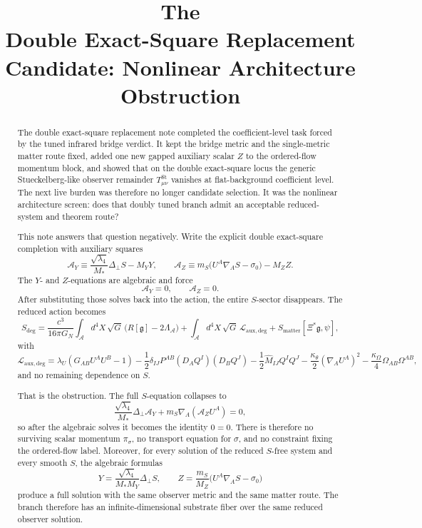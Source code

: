 \documentclass[11pt]{article}
\title{\textbf{The \TheoryName{}}\\[0.4em]
\large Double Exact-Square Replacement Candidate: Nonlinear Architecture Obstruction}
\author{}
\date{}
\newcommand{\Sub}{\mathcal{A}}
\newcommand{\BridgeMetric}{\mathfrak{g}}
\newcommand{\AY}{\mathcal A_Y}
\newcommand{\AZ}{\mathcal A_Z}
\begin{document}
\maketitle

\begin{abstract}
The double exact-square replacement note completed the coefficient-level task forced by the tuned infrared bridge verdict. It kept the bridge metric and the single-metric matter route fixed, added one new gapped auxiliary scalar \(Z\) to the ordered-flow momentum block, and showed that on the double exact-square locus the generic Stueckelberg-like observer remainder \(T_{\mu\nu}^{\mathrm{St}}\) vanishes at flat-background coefficient level. The next live burden was therefore no longer candidate selection. It was the nonlinear architecture screen: does that doubly tuned branch admit an acceptable reduced-system and theorem route?

This note answers that question negatively. Write the explicit double exact-square completion with auxiliary squares
\[
\AY
\equiv
\frac{\sqrt{\lambda_4}}{M_*}\Delta_\perp S-M_YY,
\qquad
\AZ
\equiv
m_S\bigl(U^A\nabla_A S-\sigma_0\bigr)-M_ZZ.
\]
The \(Y\)- and \(Z\)-equations are algebraic and force
\[
\AY=0,
\qquad
\AZ=0.
\]
After substituting those solves back into the action, the entire \(S\)-sector disappears. The reduced action becomes
\[
S_{\mathrm{deg}}
=
\frac{c^3}{16\pi G_N}
\int_{\Sub} d^4X\,\sqrt{G}\,\bigl(R[\BridgeMetric]-2\Lambda_{\Sub}\bigr)
+\int_{\Sub} d^4X\,\sqrt{G}\,\mathcal L_{\mathrm{aux,deg}}
+S_{\mathrm{matter}}[\Xi^*\BridgeMetric,\psi],
\]
with
\[
\mathcal L_{\mathrm{aux,deg}}
=
\lambda_U(G_{AB}U^AU^B-1)
-\frac12\delta_{IJ}P^{AB}(D_AQ^I)(D_BQ^J)
-\frac12\widehat M_{IJ}Q^IQ^J
-\frac{\kappa_\theta}{2}(\nabla_AU^A)^2
-\frac{\kappa_\Omega}{4}\Omega_{AB}\Omega^{AB},
\]
and no remaining dependence on \(S\).

That is the obstruction. The full \(S\)-equation collapses to
\[
\frac{\sqrt{\lambda_4}}{M_*}\Delta_\perp \AY
+m_S\nabla_A(\AZ U^A)=0,
\]
so after the algebraic solves it becomes the identity \(0=0\). There is therefore no surviving scalar momentum \(\pi_\sigma\), no transport equation for \(\sigma\), and no constraint fixing the ordered-flow label. Moreover, for every solution of the reduced \(S\)-free system and every smooth \(S\), the algebraic formulas
\[
Y=\frac{\sqrt{\lambda_4}}{M_*M_Y}\Delta_\perp S,
\qquad
Z=\frac{m_S}{M_Z}\bigl(U^A\nabla_A S-\sigma_0\bigr)
\]
produce a full solution with the same observer metric and the same matter route. The branch therefore has an infinite-dimensional substrate fiber over the same reduced observer solution.


\end{abstract}
\end{document}
